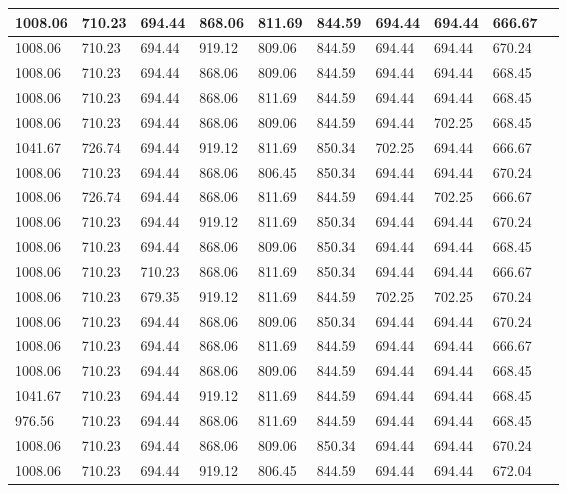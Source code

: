 \begin{longtable}{|l|l|l|l|l|l|l|l|l|l|}
		1008.06  & 710.23  & 694.44  & 868.06   & 811.69 & 844.59   & 694.44  & 694.44  & 666.67  \\ \hline
		1008.06  & 710.23  & 694.44  & 919.12   & 809.06 & 844.59   & 694.44  & 694.44  & 670.24  \\ \hline
		1008.06  & 710.23  & 694.44  & 868.06   & 809.06 & 844.59   & 694.44  & 694.44  & 668.45  \\ \hline
		1008.06  & 710.23  & 694.44  & 868.06   & 811.69 & 844.59   & 694.44  & 694.44  & 668.45  \\ \hline
		1008.06  & 710.23  & 694.44  & 868.06   & 809.06 & 844.59   & 694.44  & 702.25  & 668.45  \\ \hline
		1041.67  & 726.74  & 694.44  & 919.12   & 811.69 & 850.34   & 702.25  & 694.44  & 666.67  \\ \hline
		1008.06  & 710.23  & 694.44  & 868.06   & 806.45 & 850.34   & 694.44  & 694.44  & 670.24  \\ \hline
		1008.06  & 726.74  & 694.44  & 868.06   & 811.69 & 844.59   & 694.44  & 702.25  & 666.67  \\ \hline
		1008.06  & 710.23  & 694.44  & 919.12   & 811.69 & 850.34   & 694.44  & 694.44  & 670.24  \\ \hline
		1008.06  & 710.23  & 694.44  & 868.06   & 809.06 & 850.34   & 694.44  & 694.44  & 668.45  \\ \hline
		1008.06  & 710.23  & 710.23  & 868.06   & 811.69 & 850.34   & 694.44  & 694.44  & 666.67  \\ \hline
		1008.06  & 710.23  & 679.35  & 919.12   & 811.69 & 844.59   & 702.25  & 702.25  & 670.24  \\ \hline
		1008.06  & 710.23  & 694.44  & 868.06   & 809.06 & 850.34   & 694.44  & 694.44  & 670.24  \\ \hline
		1008.06  & 710.23  & 694.44  & 868.06   & 811.69 & 844.59   & 694.44  & 694.44  & 666.67  \\ \hline
		1008.06  & 710.23  & 694.44  & 868.06   & 809.06 & 844.59   & 694.44  & 694.44  & 668.45  \\ \hline
		1041.67  & 710.23  & 694.44  & 919.12   & 811.69 & 844.59   & 694.44  & 694.44  & 668.45  \\ \hline
		976.56   & 710.23  & 694.44  & 868.06   & 811.69 & 844.59   & 694.44  & 694.44  & 668.45  \\ \hline
		1008.06  & 710.23  & 694.44  & 868.06   & 809.06 & 850.34   & 694.44  & 694.44  & 670.24  \\ \hline
		1008.06  & 710.23  & 694.44  & 919.12   & 806.45 & 844.59   & 694.44  & 694.44  & 672.04  \\ \hline

\end{longtable}

